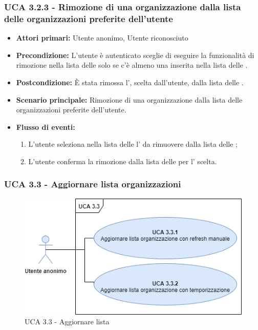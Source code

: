 \subsubsection{UCA 3.2.3 - Rimozione di una organizzazione dalla lista delle organizzazioni preferite dell'utente}%
\begin{itemize}
	\item \textbf{Attori primari:} Utente anonimo, Utente riconosciuto
	\item \textbf{Precondizione:}  L'utente è autenticato sceglie di eseguire la funzionalità di rimozione nella lista delle  solo se c'è almeno una  inserita nella lista delle .
	\item \textbf{Postcondizione:} È stata rimossa l', scelta dall'utente, dalla lista delle .
	\item \textbf{Scenario principale:} Rimozione di una organizzazione dalla lista delle organizzazioni preferite dell'utente.
	\item \textbf{Flusso di eventi:}
	\begin{enumerate}
		\item L'utente seleziona nella lista delle  l' da rimuovere dalla lista delle ;
		\item L'utente conferma la rimozione dalla lista delle  per l' scelta.
	\end{enumerate}
\end{itemize}

\subsubsection{UCA 3.3 - Aggiornare lista organizzazioni}%

\begin{figure}[h]
	\centering
	\includegraphics[scale=0.5, center]{Sezioni/UseCase/Immagini/UCA3.3.png}
	\caption{UCA 3.3 - Aggiornare lista }
\end{figure}

